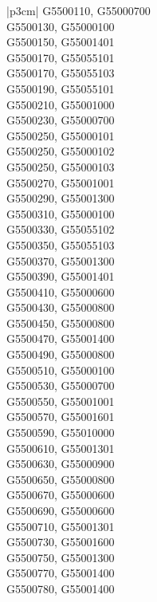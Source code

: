 \begin{customLongTable}{ |p{3cm}| }
G5500110, G55000700 \\ \hline
G5500130, G55000100 \\ \hline
G5500150, G55001401 \\ \hline
G5500170, G55055101 \\ \hline
G5500170, G55055103 \\ \hline
G5500190, G55055101 \\ \hline
G5500210, G55001000 \\ \hline
G5500230, G55000700 \\ \hline
G5500250, G55000101 \\ \hline
G5500250, G55000102 \\ \hline
G5500250, G55000103 \\ \hline
G5500270, G55001001 \\ \hline
G5500290, G55001300 \\ \hline
G5500310, G55000100 \\ \hline
G5500330, G55055102 \\ \hline
G5500350, G55055103 \\ \hline
G5500370, G55001300 \\ \hline
G5500390, G55001401 \\ \hline
G5500410, G55000600 \\ \hline
G5500430, G55000800 \\ \hline
G5500450, G55000800 \\ \hline
G5500470, G55001400 \\ \hline
G5500490, G55000800 \\ \hline
G5500510, G55000100 \\ \hline
G5500530, G55000700 \\ \hline
G5500550, G55001001 \\ \hline
G5500570, G55001601 \\ \hline
G5500590, G55010000 \\ \hline
G5500610, G55001301 \\ \hline
G5500630, G55000900 \\ \hline
G5500650, G55000800 \\ \hline
G5500670, G55000600 \\ \hline
G5500690, G55000600 \\ \hline
G5500710, G55001301 \\ \hline
G5500730, G55001600 \\ \hline
G5500750, G55001300 \\ \hline
G5500770, G55001400 \\ \hline
G5500780, G55001400 \\ \hline

\end{customLongTable}
